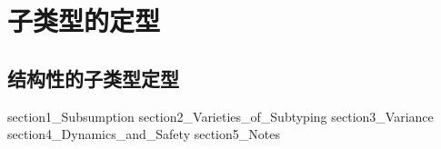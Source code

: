 \part{子类型的定型}
\chapter{结构性的子类型定型}\label{chapter:subtyping}

{section1_Subsumption}
{section2_Varieties_of_Subtyping}
{section3_Variance}
{section4_Dynamics_and_Safety}
{section5_Notes}

